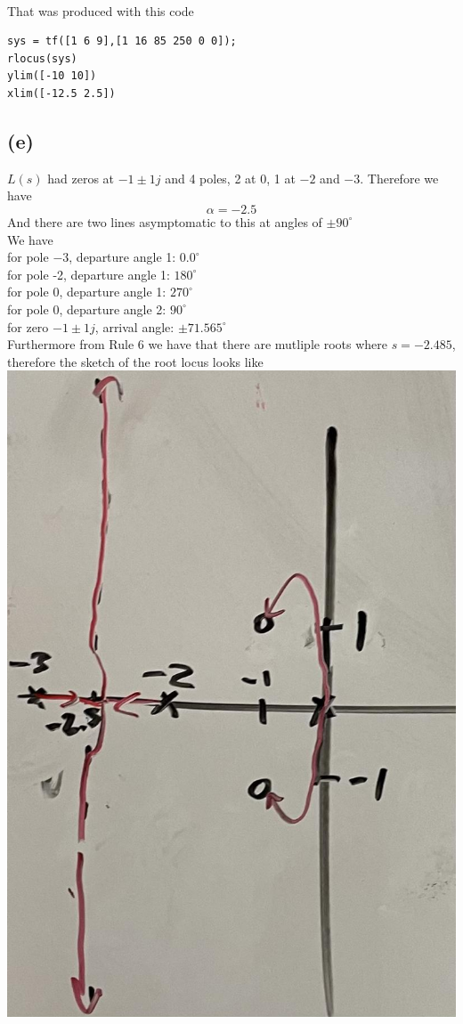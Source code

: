 \documentclass[12pt]{article}
\begin{document}
\\That was produced with this code
\begin{verbatim}
sys = tf([1 6 9],[1 16 85 250 0 0]);
rlocus(sys)
ylim([-10 10])
xlim([-12.5 2.5])
\end{verbatim}
\subsection*{(e)}
$L(s)$ had zeros at $-1\pm1j$ and 4 poles, 2 at 0, 1 at $-2$ and $-3$. Therefore we have
$$\alpha=-2.5$$
And there are two lines asymptomatic to this at angles of $\pm90^{\circ}$
\\
We have
\\for pole $-3$, departure angle 1: $0.0^{\circ}$
\\for pole -2, departure angle 1: $180^{\circ}$
\\for pole 0, departure angle 1: $270^{\circ}$
\\for pole 0, departure angle 2: $90^{\circ}$
\\for zero $-1\pm1j$, arrival angle: $\pm71.565^{\circ}$\\
Furthermore from Rule 6 we have that there are mutliple roots where $s=-2.485$, therefore the sketch of the root locus looks like
\\
\includegraphics[scale=.15]{Problem2Sketch2.jpg}
\end{document}
